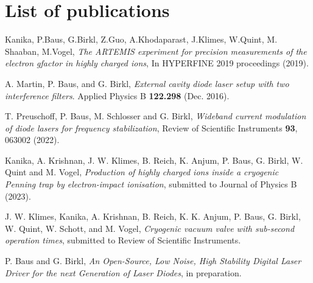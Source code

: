 \documentclass[12pt]{book}
\begin{document}
\chapter*{List of publications}

Kanika, P.Baus, G.Birkl, Z.Guo, A.Khodaparast, J.Klimes, W.Quint, M. Shaaban, M.Vogel, \textit{The ARTEMIS experiment for precision measurements of the electron gfactor in highly charged ions}, In HYPERFINE 2019 proceedings (2019).\par\vspace{12pt}

A. Martin, P. Baus, and G. Birkl, \textit{External cavity diode laser setup
with two interference filters}. Applied Physics B \textbf{122.298} (Dec. 2016).\par\vspace{12pt}

T. Preuschoff, P. Baus, M. Schlosser and G. Birkl, \textit{Wideband current modulation of diode lasers for frequency stabilization}, Review of Scientific Instruments \textbf{93}, 063002 (2022).\par\vspace{12pt}

Kanika, A. Krishnan, J. W. Klimes, B. Reich, K. Anjum, P. Baus, G. Birkl, W. Quint and M. Vogel, \textit{Production of highly charged ions inside a cryogenic
Penning trap by electron-impact ionisation}, submitted to Journal of Physics B (2023).\par\vspace{12pt}

J. W. Klimes, Kanika, A. Krishnan, B. Reich, K. K. Anjum, P. Baus, G. Birkl, W. Quint, W. Schott, and M. Vogel, \textit{Cryogenic vacuum valve with sub-second operation times}, submitted to Review of Scientific Instruments.\par\vspace{12pt}

P. Baus and G. Birkl, \textit{An Open-Source, Low Noise, High Stability Digital Laser Driver for the next
Generation of Laser Diodes}, in preparation.
\end{document}
